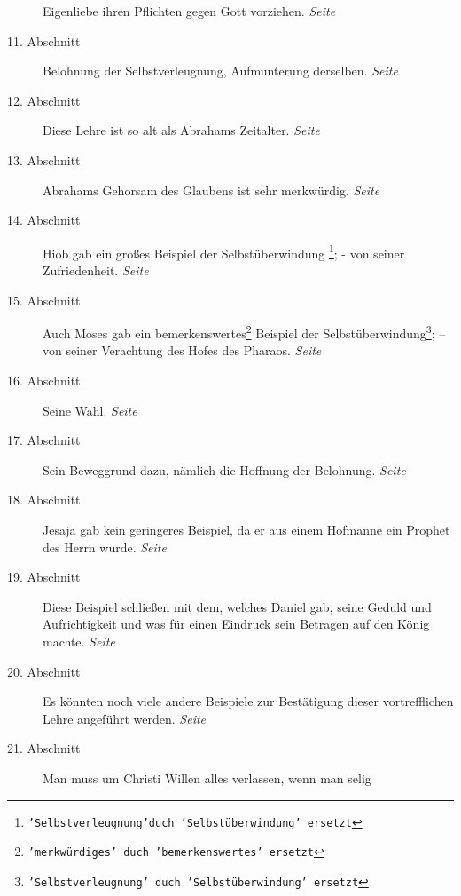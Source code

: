 \begin{description}
Eigenliebe ihren Pflichten gegen Gott vorziehen.
\dotfill \textit{Seite~\pageref{kap4_ab10}}\\
\item[11. Abschnitt] Belohnung der Selbstverleugnung, Aufmunterung derselben.
\dotfill \textit{Seite~\pageref{kap4_ab11}}\\
\item[12. Abschnitt] Diese Lehre ist so alt als Abrahams Zeitalter.
\dotfill \textit{Seite~\pageref{kap4_ab12}}\\
\item[13. Abschnitt] Abrahams Gehorsam des Glaubens ist sehr merkwürdig.
\dotfill \textit{Seite~\pageref{kap4_ab13}}\\
\item[14. Abschnitt] Hiob gab ein großes Beispiel der Selbstüberwindung
\footnote{\texttt{'Selbstverleugnung'duch 'Selbstüberwindung' ersetzt}}; - von
seiner Zufriedenheit.
\dotfill \textit{Seite~\pageref{kap4_ab14}}\\
\item[15. Abschnitt] Auch Moses gab ein
bemerkenswertes\footnote{\texttt{'merkwürdiges' duch 'bemerkenswertes' ersetzt}}
Beispiel der
Selbstüberwindung\footnote{\texttt{'Selbstverleugnung' duch 'Selbstüberwindung'
ersetzt}}; -- von seiner Verachtung des Hofes des Pharaos.
\dotfill \textit{Seite~\pageref{kap4_ab15}}\\
\item[16. Abschnitt] Seine Wahl.
\dotfill \textit{Seite~\pageref{kap4_ab16}}\\
\item[17. Abschnitt] Sein Beweggrund dazu, nämlich die Hoffnung der Belohnung.
\dotfill \textit{Seite~\pageref{kap4_ab17}}\\
\item[18. Abschnitt] Jesaja gab kein geringeres Beispiel, da er aus einem
Hofmanne ein Prophet des Herrn wurde.
\dotfill \textit{Seite~\pageref{kap4_ab18}}\\
\item[19. Abschnitt] Diese Beispiel schließen mit dem, welches Daniel gab,
seine Geduld und Aufrichtigkeit und was für einen Eindruck sein Betragen auf
den König machte.
\dotfill \textit{Seite~\pageref{kap4_ab19}}\\
\item[20. Abschnitt] Es könnten noch viele andere Beispiele zur Bestätigung
dieser vortrefflichen Lehre angeführt werden.
\dotfill \textit{Seite~\pageref{kap4_ab20}}\\
\item[21. Abschnitt] Man muss um Christi Willen alles verlassen, wenn man selig

\end{description}
